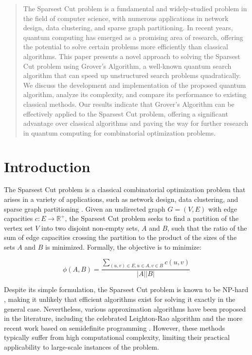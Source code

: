 \begin{abstract}
The Sparsest Cut problem is a fundamental and widely-studied problem in the field of computer science, with numerous applications in network design, data clustering, and sparse graph partitioning. In recent years, quantum computing has emerged as a promising area of research, offering the potential to solve certain problems more efficiently than classical algorithms. This paper presents a novel approach to solving the Sparsest Cut problem using Grover's Algorithm, a well-known quantum search algorithm that can speed up unstructured search problems quadratically. We discuss the development and implementation of the proposed quantum algorithm, analyze its complexity, and compare its performance to existing classical methods. Our results indicate that Grover's Algorithm can be effectively applied to the Sparsest Cut problem, offering a significant advantage over classical algorithms and paving the way for further research in quantum computing for combinatorial optimization problems.
\end{abstract}

\section{Introduction}

The Sparsest Cut problem is a classical combinatorial optimization problem that arises in a variety of applications, such as network design, data clustering, and sparse graph partitioning \cite{arora2009expander}. Given an undirected graph $G=(V,E)$ with edge capacities $c: E \rightarrow \mathbb{R}^+$, the Sparsest Cut problem seeks to find a partition of the vertex set $V$ into two disjoint non-empty sets, $A$ and $B$, such that the ratio of the sum of edge capacities crossing the partition to the product of the sizes of the sets $A$ and $B$ is minimized. Formally, the objective is to minimize:

\begin{equation}
\phi(A,B) = \frac{\sum_{(u,v) \in E, u \in A, v \in B} c(u,v)}{|A||B|}
\end{equation}

Despite its simple formulation, the Sparsest Cut problem is known to be NP-hard \cite{shahrokhi1990maximum}, making it unlikely that efficient algorithms exist for solving it exactly in the general case. Nevertheless, various approximation algorithms have been proposed in the literature, including the celebrated Leighton-Rao algorithm \cite{leighton1999multicommodity} and the more recent work based on semidefinite programming \cite{arora2009expander}. However, these methods typically suffer from high computational complexity, limiting their practical applicability to large-scale instances of the problem.

